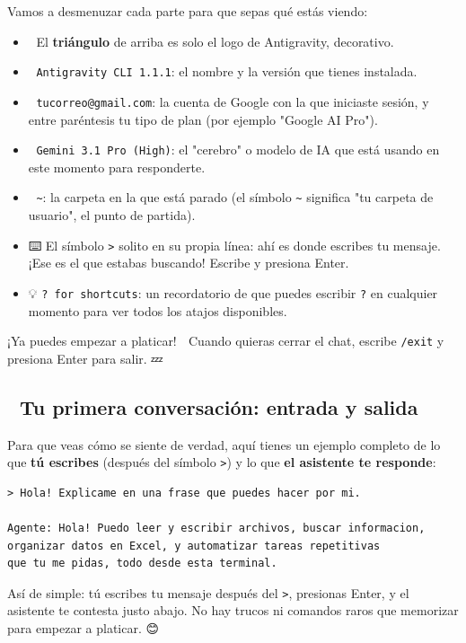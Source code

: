 \documentclass[12pt]{article}
\begin{document}
Vamos a desmenuzar cada parte para que sepas qué estás viendo:
\begin{itemize}
    \item 🔺 El \textbf{triángulo} de arriba es solo el logo de Antigravity, decorativo.
    \item 📛 \texttt{Antigravity CLI 1.1.1}: el nombre y la versión que tienes instalada.
    \item 📧 \texttt{tucorreo@gmail.com}: la cuenta de Google con la que iniciaste sesión, y entre paréntesis tu tipo de plan (por ejemplo "Google AI Pro").
    \item 🧠 \texttt{Gemini 3.1 Pro (High)}: el "cerebro" o modelo de IA que está usando en este momento para responderte.
    \item 📂 \texttt{\textasciitilde}: la carpeta en la que está parado (el símbolo \texttt{\textasciitilde} significa "tu carpeta de usuario", el punto de partida).
    \item ⌨️ El símbolo \texttt{>} solito en su propia línea: ahí es donde escribes tu mensaje. ¡Ese es el que estabas buscando! Escribe y presiona Enter.
    \item 💡 \texttt{? for shortcuts}: un recordatorio de que puedes escribir \texttt{?} en cualquier momento para ver todos los atajos disponibles.
\end{itemize}

¡Ya puedes empezar a platicar! 🎉 Cuando quieras cerrar el chat, escribe \texttt{/exit} y presiona Enter para salir. 💤

\subsection{💬 Tu primera conversación: entrada y salida}
Para que veas cómo se siente de verdad, aquí tienes un ejemplo completo de lo que \textbf{tú escribes} (después del símbolo \texttt{>}) y lo que \textbf{el asistente te responde}:

\begin{verbatim}
> Hola! Explicame en una frase que puedes hacer por mi.

Agente: Hola! Puedo leer y escribir archivos, buscar informacion,
organizar datos en Excel, y automatizar tareas repetitivas
que tu me pidas, todo desde esta terminal.
\end{verbatim}

Así de simple: tú escribes tu mensaje después del \texttt{>}, presionas Enter, y el asistente te contesta justo abajo. No hay trucos ni comandos raros que memorizar para empezar a platicar. 😊
\end{document}
